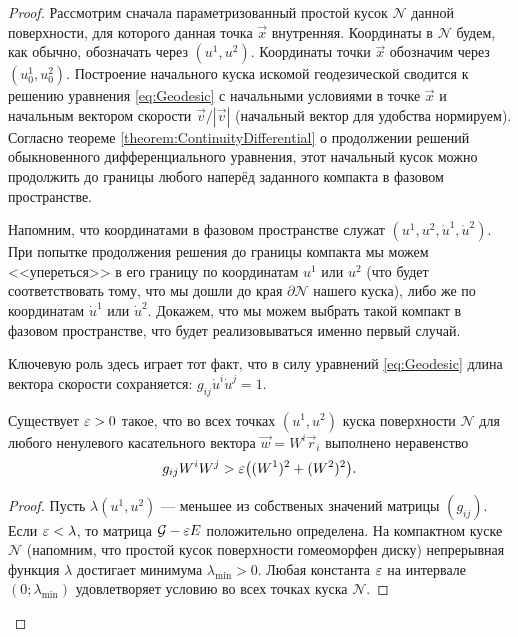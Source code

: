 \begin{proof}
	Рассмотрим сначала параметризованный простой кусок $\mathcal{N}$ данной поверхности, для которого данная точка $\vec{x}$ внутренняя. Координаты в $\mathcal{N}$ будем, как обычно, обозначать через $(u^1, u^2)$. Координаты точки $\vec{x}$ обозначим через $(u_0^1, u_0^2)$. Построение начального куска искомой геодезической сводится к решению уравнения \eqref{eq:Geodesic} с начальными условиями в точке $\vec{x}$ и начальным вектором скорости $\vec{v} / |\vec{v}|$ (начальный вектор для удобства нормируем). Согласно теореме \ref{theorem:ContinuityDifferential} о продолжении решений обыкновенного дифференциального уравнения, этот начальный кусок можно продолжить до границы любого наперёд заданного компакта в фазовом пространстве.

	Напомним, что координатами в фазовом пространстве служат $(u^1, u^2, \dot{u}^1, \dot{u}^2)$. При попытке продолжения решения до границы компакта мы можем <<упереться>> в его границу по координатам $u^1$ или $u^2$ (что будет соответствовать тому, что мы дошли до края $\partial\mathcal{N}$ нашего куска), либо же по координатам $\dot{u}^1$ или $\dot{u}^2$. Докажем, что мы можем выбрать такой компакт в фазовом пространстве, что будет реализовываться именно первый случай.

	Ключевую роль здесь играет тот факт, что в силу уравнений \eqref{eq:Geodesic} длина вектора скорости сохраняется: $g_{ij}\dot{u}^i\dot{u}^j = 1$.

	\begin{lemma}
		Существует $\varepsilon > 0$ такое, что во всех точках $(u^1, u^2)$ куска поверхности $\mathcal{N}$ для любого ненулевого касательного вектора $\vec{w} = W^i\vec{r}_i$ выполнено неравенство
		\[
			g_{ij}W^iW^j > \varepsilon\big((W^1)^2 + (W^2)^2\big).
		\]
	\end{lemma}

	\begin{proof}
		Пусть $\lambda(u^1, u^2)$ --- меньшее из собственых значений матрицы $(g_{ij})$. Если $\varepsilon < \lambda$, то матрица $\mathcal{G} - \varepsilon E$ положительно определена. На компактном куске $\mathcal{N}$ (напомним, что простой кусок поверхности гомеоморфен диску) непрерывная функция $\lambda$ достигает минимума $\lambda_{\min} > 0$. Любая константа $\varepsilon$ на интервале $(0; \lambda_{\min})$ удовлетворяет условию во всех точках куска $\mathcal{N}$.
	\end{proof}


\end{proof}
